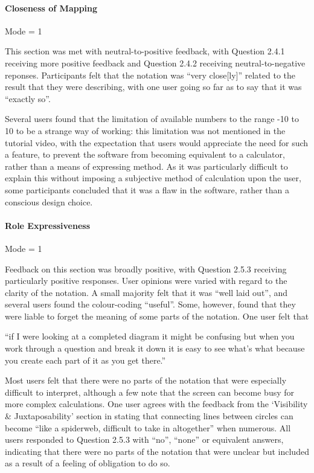 \documentclass[12pt,twoside,notitlepage,xetex]{report}
\begin{document}
{\paragraph{Closeness of Mapping}\hfill

Mode = 1

This section was met with neutral-to-positive feedback, with Question 2.4.1 receiving more positive feedback and Question 2.4.2 receiving neutral-to-negative reponses.  Participants felt that the notation was ``very close[ly]'' related to the result that they were describing, with one user going so far as to say that it was ``exactly so''.

Several users found that the limitation of available numbers to the range -10 to 10 to be a strange way of working: this limitation was not mentioned in the tutorial video, with the expectation that users would appreciate the need for such a feature, to prevent the software from becoming equivalent to a calculator, rather than a means of expressing method.  As it was particularly difficult to explain this without imposing a subjective method of calculation upon the user, some participants concluded that it was a flaw in the software, rather than a conscious design choice.

\paragraph{Role Expressiveness}\hfill

Mode = 1

Feedback on this section was broadly positive, with Question 2.5.3 receiving particularly positive responses.  User opinions were varied with regard to the clarity of the notation.  A small majority felt that it was ``well laid out'', and several users found the colour-coding ``useful''.  Some, however, found that they were liable to forget the meaning of some parts of the notation.  One user felt that
\begin{center}
\parbox[c]{\textwidth-2cm}{
\small
``if I were looking at a completed diagram it might be confusing but when you work through a question and break it down it is easy to see what's what because you create each part of it as you get there.''
}
\end{center}

Most users felt that there were no parts of the notation that were especially difficult to interpret, although a few note that the screen can become busy for more complex calculations.  One user agrees with the feedback from the `Visibility \& Juxtaposability' section in stating that connecting lines between circles can become ``like a spiderweb, difficult to take in altogether'' when numerous.  All users responded to Question 2.5.3 with ``no'', ``none'' or equivalent answers, indicating that there were no parts of the notation that were unclear but included as a result of a feeling of obligation to do so.

}
\end{document}
